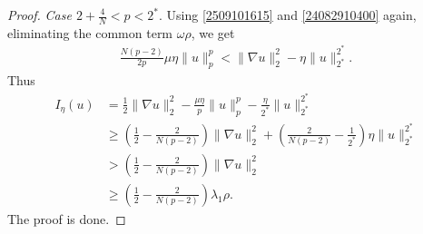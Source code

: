 \documentclass[10pt]{article}
\numberwithin{equation}{section}
\numberwithin{equation}{section}
\begin{document}
\begin{proof}
\smallskip
{\it Case $2+\frac{4}{N}<p<2^*$}.
Using \eqref{2509101615} and \eqref{24082910400} again,  eliminating the common term $\omega\rho$, we get
\[
\begin{aligned}
\frac{N(p-2)}{2p}\mu\eta \|u\|_p^p< \|\nabla u\|_2^2-\eta\|u\|_{2^*}^{2^*}.
\end{aligned}
\]
Thus
\begin{equation*}\label{2509110051}
\begin{aligned}
I_\eta(u)&=\frac{1}{2}\|\nabla u\|_2^2-\frac{\mu\eta}{p}\|u\|_p^p-\frac{\eta}{2^*}\|u\|_{2^*}^{2^*}\\
&\ge \left(\frac{1}{2}-\frac{2}{N(p-2)}\right)\|\nabla u\|_2^2+\left(\frac{2}{N(p-2)}-\frac{1}{2^*}\right)\eta\|u\|_{2^*}^{2^*}\\
&>\left(\frac{1}{2}-\frac{2}{N(p-2)}\right)\|\nabla u\|_2^2\\
&\ge \left(\frac{1}{2}-\frac{2}{N(p-2)}\right)\lambda_1\rho.
\end{aligned}
\end{equation*}
The proof is done.
\end{proof}
\end{document}
